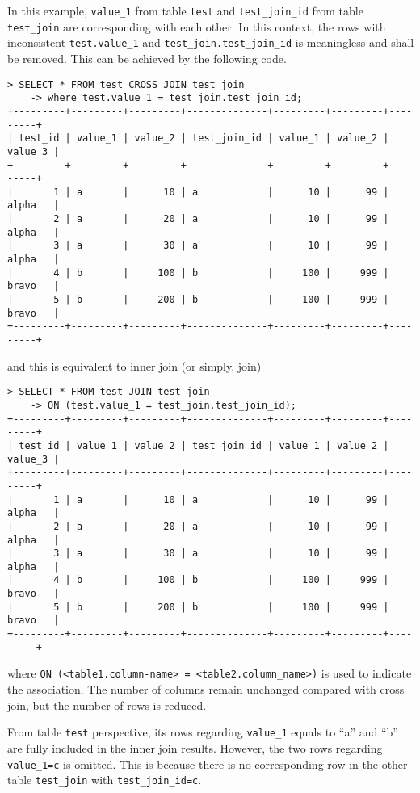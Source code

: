 In this example, \verb|value_1| from table \verb|test| and \verb|test_join_id| from table \verb|test_join| are corresponding with each other. In this context, the rows with inconsistent \verb|test.value_1| and \verb|test_join.test_join_id| is meaningless and shall be removed. This can be achieved by the following code.
\begin{lstlisting}
> SELECT * FROM test CROSS JOIN test_join
    -> where test.value_1 = test_join.test_join_id;
+---------+---------+---------+--------------+---------+---------+---------+
| test_id | value_1 | value_2 | test_join_id | value_1 | value_2 | value_3 |
+---------+---------+---------+--------------+---------+---------+---------+
|       1 | a       |      10 | a            |      10 |      99 | alpha   |
|       2 | a       |      20 | a            |      10 |      99 | alpha   |
|       3 | a       |      30 | a            |      10 |      99 | alpha   |
|       4 | b       |     100 | b            |     100 |     999 | bravo   |
|       5 | b       |     200 | b            |     100 |     999 | bravo   |
+---------+---------+---------+--------------+---------+---------+---------+
\end{lstlisting}
and this is equivalent to inner join (or simply, join)
\begin{lstlisting}
> SELECT * FROM test JOIN test_join
    -> ON (test.value_1 = test_join.test_join_id);
+---------+---------+---------+--------------+---------+---------+---------+
| test_id | value_1 | value_2 | test_join_id | value_1 | value_2 | value_3 |
+---------+---------+---------+--------------+---------+---------+---------+
|       1 | a       |      10 | a            |      10 |      99 | alpha   |
|       2 | a       |      20 | a            |      10 |      99 | alpha   |
|       3 | a       |      30 | a            |      10 |      99 | alpha   |
|       4 | b       |     100 | b            |     100 |     999 | bravo   |
|       5 | b       |     200 | b            |     100 |     999 | bravo   |
+---------+---------+---------+--------------+---------+---------+---------+
\end{lstlisting}
where \verb|ON (<table1.column-name> = <table2.column_name>)| is used to indicate the association. The number of columns remain unchanged compared with cross join, but the number of rows is reduced.

From table \verb|test| perspective, its rows regarding \verb|value_1| equals to ``a'' and ``b'' are fully included in the inner join results. However, the two rows regarding \verb|value_1=c| is omitted. This is because there is no corresponding row in the other table \verb|test_join| with \verb|test_join_id=c|.


